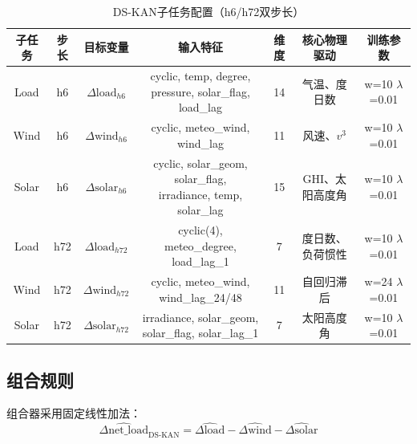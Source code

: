 \documentclass[12pt,a4paper,oneside]{ctexbook}
\begin{document}
\begin{table}[htbp]
\centering
\caption{DS-KAN子任务配置（h6/h72双步长）}
\label{tab:dskan-config}
\begin{tabular}{ccccccc}
\toprule
子任务 & 步长 & 目标变量 & 输入特征 & 维度 & 核心物理驱动 & 训练参数 \\
\midrule
Load & h6 & $\Delta\text{load}_{h6}$ & \makecell{cyclic, temp, degree,\\pressure, solar\_flag, load\_lag} & 14 & 气温、度日数 & \makecell{w=10\\$\lambda$=0.01} \\
\addlinespace
Wind & h6 & $\Delta\text{wind}_{h6}$ & cyclic, meteo\_wind, wind\_lag & 11 & 风速、$v^3$ & \makecell{w=10\\$\lambda$=0.01} \\
\addlinespace
Solar & h6 & $\Delta\text{solar}_{h6}$ & \makecell{cyclic, solar\_geom, solar\_flag,\\irradiance, temp, solar\_lag} & 15 & GHI、太阳高度角 & \makecell{w=10\\$\lambda$=0.01} \\
\midrule
Load & h72 & $\Delta\text{load}_{h72}$ & cyclic(4), meteo\_degree, load\_lag\_1 & 7 & 度日数、负荷惯性 & \makecell{w=10\\$\lambda$=0.01} \\
\addlinespace
Wind & h72 & $\Delta\text{wind}_{h72}$ & cyclic, meteo\_wind, wind\_lag\_24/48 & 11 & 自回归滞后 & \makecell{w=24\\$\lambda$=0.01} \\
\addlinespace
Solar & h72 & $\Delta\text{solar}_{h72}$ & \makecell{irradiance, solar\_geom,\\solar\_flag, solar\_lag\_1} & 7 & 太阳高度角 & \makecell{w=10\\$\lambda$=0.01} \\
\bottomrule
\end{tabular}
\end{table}

\subsection{组合规则}

组合器采用固定线性加法：
\begin{equation}
\widehat{\Delta\text{net\_load}}_{\text{DS-KAN}} = \widehat{\Delta\text{load}} - \widehat{\Delta\text{wind}} - \widehat{\Delta\text{solar}}
\label{eq:dskan-combo}
\end{equation}
\end{document}
